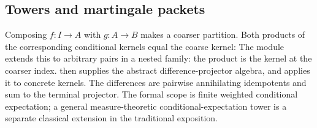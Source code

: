 \subsection{Towers and martingale packets}
Composing $f:I\to A$ with $g:A\to B$ makes a coarser partition. Both products of the corresponding conditional kernels equal the coarse kernel:
The module extends this to arbitrary pairs in a nested family: the product is the kernel at the coarser index.  then supplies the abstract difference-projector algebra, and  applies it to concrete kernels. The differences are pairwise annihilating idempotents and sum to the terminal projector. The formal scope is finite weighted conditional expectation; a general measure-theoretic conditional-expectation tower is a separate classical extension in the traditional exposition.
